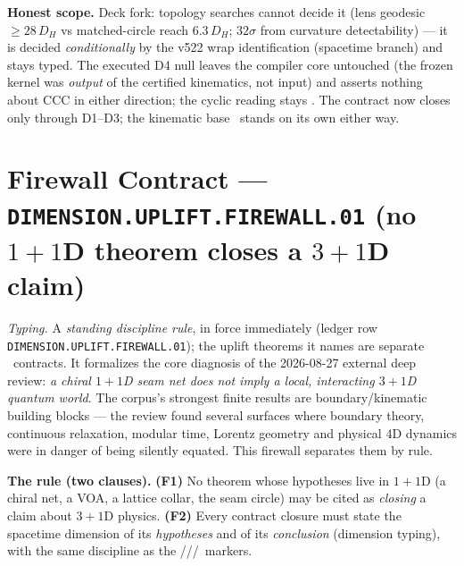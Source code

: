 \par\smallskip\noindent\textbf{Honest scope.}  Deck fork: topology searches cannot decide it
(lens geodesic $\ge28\,D_H$ vs matched-circle reach $6.3\,D_H$; $32\sigma$ from curvature
detectability) --- it is decided \emph{conditionally} by the v522 wrap identification (spacetime
branch) and stays typed.  The executed D4 null leaves the compiler core untouched (the frozen
kernel was \emph{output} of the certified kinematics, not input) and asserts nothing about CCC
in either direction; the cyclic reading stays \mC.  The contract now closes only through
D1--D3; the kinematic base \mE\ stands on its own either way.

\section*{Firewall Contract --- \texttt{DIMENSION.UPLIFT.FIREWALL.01} (no $1{+}1$D theorem closes a $3{+}1$D claim)}
\noindent\emph{Typing.} A \emph{standing discipline rule}, in force immediately (ledger row
\texttt{DIMENSION.UPLIFT.FIREWALL.01}); the uplift theorems it names are separate \mO\ contracts.
It formalizes the core diagnosis of the 2026-08-27 external deep review: \emph{a chiral $1{+}1$D
seam net does not imply a local, interacting $3{+}1$D quantum world}.  The corpus's strongest
finite results are boundary/kinematic building blocks --- the review found several surfaces where
boundary theory, continuous relaxation, modular time, Lorentz geometry and physical 4D dynamics
were in danger of being silently equated.  This firewall separates them by rule.

\par\smallskip\noindent\textbf{The rule (two clauses).}
\textbf{(F1)} No theorem whose hypotheses live in $1{+}1$D (a chiral net, a VOA, a lattice
collar, the seam circle) may be cited as \emph{closing} a claim about $3{+}1$D physics.
\textbf{(F2)} Every contract closure must state the spacetime dimension of its \emph{hypotheses}
and of its \emph{conclusion} (dimension typing), with the same discipline as the
\mE/\mC/\mO/\mX\ markers.


